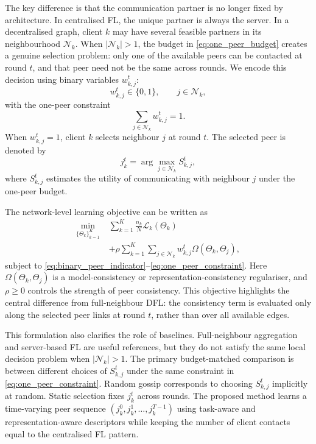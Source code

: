 \documentclass[conference]{IEEEtran}
\begin{document}
The key difference is that the communication partner is no longer fixed by architecture. In centralised FL, the unique partner is always the server. In a decentralised graph, client $k$ may have several feasible partners in its neighbourhood $\mathcal{N}_k$. When $|\mathcal{N}_k|>1$, the budget in \eqref{eq:one_peer_budget} creates a genuine selection problem: only one of the available peers can be contacted at round $t$, and that peer need not be the same across rounds. We encode this decision using binary variables $w_{k,j}^t$:
\begin{equation}
    w_{k,j}^{t}\in\{0,1\},
    \qquad j\in\mathcal{N}_k,
    \label{eq:binary_peer_indicator}
\end{equation}
with the one-peer constraint
\begin{equation}
    \sum_{j\in\mathcal{N}_k} w_{k,j}^{t}=1.
    \label{eq:one_peer_constraint}
\end{equation}
When $w_{k,j}^t=1$, client $k$ selects neighbour $j$ at round $t$. The selected peer is denoted by
\begin{equation}
    j_k^t = \arg\max_{j\in\mathcal{N}_k} S_{k,j}^{t},
    \label{eq:selection_general}
\end{equation}
where $S_{k,j}^{t}$ estimates the utility of communicating with neighbour $j$ under the one-peer budget.

The network-level learning objective can be written as
\begin{equation}
\begin{aligned}
    \min_{\{\Theta_k\}_{k=1}^{K}}\;&
    \sum_{k=1}^{K}\frac{n_k}{N}\mathcal{L}_k(\Theta_k) \\
    &+\rho\sum_{k=1}^{K}\sum_{j\in\mathcal{N}_k}
    w_{k,j}^{t}\Omega(\Theta_k,\Theta_j),
\end{aligned}
    \label{eq:global_dfl_objective}
\end{equation}
subject to \eqref{eq:binary_peer_indicator}--\eqref{eq:one_peer_constraint}. Here $\Omega(\Theta_k,\Theta_j)$ is a model-consistency or representation-consistency regulariser, and $\rho\geq0$ controls the strength of peer consistency. This objective highlights the central difference from full-neighbour DFL: the consistency term is evaluated only along the selected peer links at round $t$, rather than over all available edges.

This formulation also clarifies the role of baselines. Full-neighbour aggregation and server-based FL are useful references, but they do not satisfy the same local decision problem when $|\mathcal{N}_k|>1$. The primary budget-matched comparison is between different choices of $S_{k,j}^{t}$ under the same constraint in \eqref{eq:one_peer_constraint}. Random gossip corresponds to choosing $S_{k,j}^{t}$ implicitly at random. Static selection fixes $j_k^t$ across rounds. The proposed method learns a time-varying peer sequence $(j_k^0,j_k^1,\dots,j_k^{T-1})$ using task-aware and representation-aware descriptors while keeping the number of client contacts equal to the centralised FL pattern.
\end{document}
